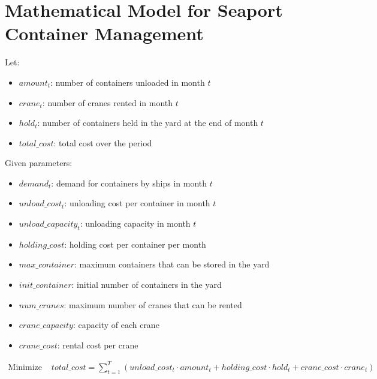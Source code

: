 \documentclass{article}
\begin{document}
\section*{Mathematical Model for Seaport Container Management}

Let:
\begin{itemize}
    \item \( amount_t \): number of containers unloaded in month \( t \) 
    \item \( crane_t \): number of cranes rented in month \( t \)
    \item \( hold_t \): number of containers held in the yard at the end of month \( t \)
    \item \( total\_cost \): total cost over the period
\end{itemize}

Given parameters:
\begin{itemize}
    \item \( demand_t \): demand for containers by ships in month \( t \)
    \item \( unload\_cost_t \): unloading cost per container in month \( t \)
    \item \( unload\_capacity_t \): unloading capacity in month \( t \)
    \item \( holding\_cost \): holding cost per container per month
    \item \( max\_container \): maximum containers that can be stored in the yard
    \item \( init\_container \): initial number of containers in the yard
    \item \( num\_cranes \): maximum number of cranes that can be rented
    \item \( crane\_capacity \): capacity of each crane
    \item \( crane\_cost \): rental cost per crane
\end{itemize}

\begin{align*}
    \text{Minimize } & total\_cost = \sum_{t=1}^{T} (unload\_cost_t \cdot amount_t + holding\_cost \cdot hold_t + crane\_cost \cdot crane_t) 
\end{align*}
\end{document}
